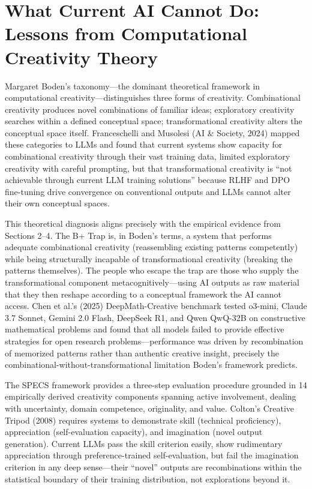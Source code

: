 \documentclass[12pt,a4paper]{article}
\begin{document}
\section{What Current AI Cannot Do: Lessons from Computational Creativity Theory}
Margaret Boden's taxonomy---the dominant theoretical framework in computational creativity---distinguishes three forms of creativity. Combinational creativity produces novel combinations of familiar ideas; exploratory creativity searches within a defined conceptual space; transformational creativity alters the conceptual space itself. Franceschelli and Musolesi (AI \& Society, 2024) mapped these categories to LLMs and found that current systems show capacity for combinational creativity through their vast training data, limited exploratory creativity with careful prompting, but that transformational creativity is ``not achievable through current LLM training solutions'' because RLHF and DPO fine-tuning drive convergence on conventional outputs and LLMs cannot alter their own conceptual spaces.

This theoretical diagnosis aligns precisely with the empirical evidence from Sections 2--4. The B+ Trap is, in Boden's terms, a system that performs adequate combinational creativity (reassembling existing patterns competently) while being structurally incapable of transformational creativity (breaking the patterns themselves). The people who escape the trap are those who supply the transformational component metacognitively---using AI outputs as raw material that they then reshape according to a conceptual framework the AI cannot access. Chen et al.'s (2025) DeepMath-Creative benchmark tested o3-mini, Claude 3.7 Sonnet, Gemini 2.0 Flash, DeepSeek R1, and Qwen QwQ-32B on constructive mathematical problems and found that all models failed to provide effective strategies for open research problems---performance was driven by recombination of memorized patterns rather than authentic creative insight, precisely the combinational-without-transformational limitation Boden's framework predicts.

The SPECS framework \citep{jordanous2012} provides a three-step evaluation procedure grounded in 14 empirically derived creativity components spanning active involvement, dealing with uncertainty, domain competence, originality, and value. Colton's Creative Tripod (2008) requires systems to demonstrate skill (technical proficiency), appreciation (self-evaluation capacity), and imagination (novel output generation). Current LLMs pass the skill criterion easily, show rudimentary appreciation through preference-trained self-evaluation, but fail the imagination criterion in any deep sense---their ``novel'' outputs are recombinations within the statistical boundary of their training distribution, not explorations beyond it.
\end{document}
